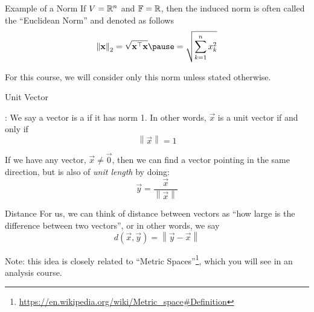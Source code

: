 \documentclass[xcoler=dvipsnames, aspectratio=169]{beamer}
\newcommand{\F}{\mathbb{F}}
\renewcommand{\norm}[1]{\left\|#1\right\|}
\begin{document}
    \begin{frame}{Example of a Norm}
        If $V=\mathbb{R}^n$ and $\F=\R$, then the induced norm is often called the ``Euclidean Norm'' and
        denoted as follows\pause
        \[
            \norm{\vec{x}}_2 = \sqrt{\vec{x}^\top\vec{x}}\pause = \sqrt{\sum_{k=1}^nx_k^2}
        \]\pause

        For this course, we will consider only this norm unless stated otherwise.
    \end{frame}
    \begin{frame}{Unit Vector}
        \begin{defn}
            : We say a vector is a  if it has norm 1. In
            other words, $\vec{x}$ is a unit vector if and only if
            \[
                \norm{\vec{x}} = 1
            \]
        \end{defn}
        \pause
        If we have any vector, $\vec{x}\neq\vec{0}$, then we can find a vector pointing in the same
        direction, but is also of \emph{unit length} by doing:
        \[
            \vec{y} = \frac{\vec{x}}{\norm{\vec{x}}}
        \]
    \end{frame}
    \begin{frame}{Distance}
        For us, we can think of distance between vectors as ``how large is the difference between
        two vectors'', or in other words, we say
        \[
            d(\vec{x},\vec{y}) = \norm{\vec{y}-\vec{x}}
        \]

        Note: this idea is closely related to ``Metric Spaces''\footnote{\url{https://en.wikipedia.org/wiki/Metric\_space\#Definition}}, which you will see in an analysis course.
    \end{frame}
\end{document}
